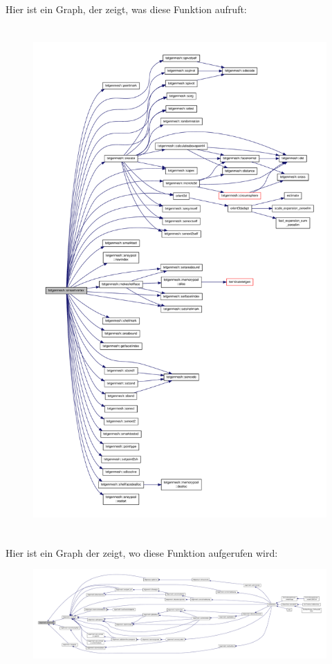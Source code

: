 Hier ist ein Graph, der zeigt, was diese Funktion aufruft\-:\nopagebreak
\begin{figure}[H]
\begin{center}
\leavevmode
\includegraphics[height=550pt]{classtetgenmesh_ad48cec74c7fbcf66ebd312661da5d0bc_cgraph}
\end{center}
\end{figure}




Hier ist ein Graph der zeigt, wo diese Funktion aufgerufen wird\-:\nopagebreak
\begin{figure}[H]
\begin{center}
\leavevmode
\includegraphics[width=350pt]{classtetgenmesh_ad48cec74c7fbcf66ebd312661da5d0bc_icgraph}
\end{center}
\end{figure}


